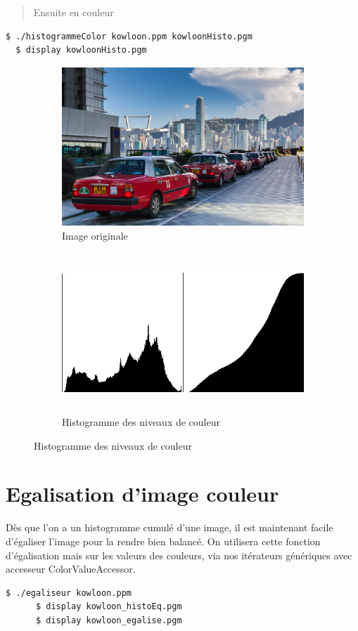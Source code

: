 \documentclass[a4paper,10pt]{article}
\begin{document}
    \begin{quote}
    Ensuite en couleur
    \end{quote}
    \begin{lstlisting}[language=Bash]
  $ ./histogrammeColor kowloon.ppm kowloonHisto.pgm     
  $ display kowloonHisto.pgm
  \end{lstlisting}
  \begin{figure}[h]
   \begin{subfigure}{1\textwidth}
    \centering
    \includegraphics[width=0.8\linewidth, height=6cm]{kowloon}
    \caption{Image originale}
    \label{fig:kowloonO}
    \end{subfigure}
     \begin{subfigure}{1\textwidth}
    \centering
    \includegraphics[width=1\linewidth, height=6cm]{kowloonHisto}   
    \caption{Histogramme des niveaux de couleur}
    \label{fig:kowloonHisto}
    \end{subfigure}
    \end{figure}

    \pagebreak
    \section{Egalisation d'image couleur}
    Dès que l'on a un histogramme cumulé d'une image, il est maintenant facile d'égaliser l'image pour la rendre bien balancé. On utilisera cette fonction d'égalisation mais sur les valeurs des couleurs, via nos itérateurs génériques avec accesseur ColorValueAccessor. 
    \begin{lstlisting}[language=Bash]
      $ ./egaliseur kowloon.ppm    
      $ display kowloon_histoEq.pgm
      $ display kowloon_egalise.pgm
    \end{lstlisting}
\end{document}
